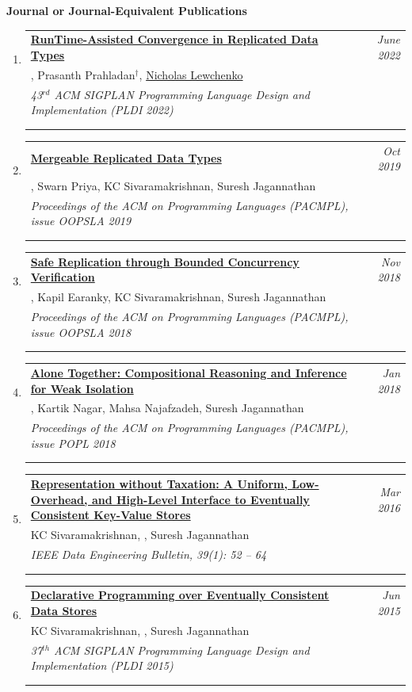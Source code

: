 \documentclass{article}
\makeatletter
\newenvironment{benumerate}[2]{
    \let\oldItem\item
    \def\item{\addtocounter{enumi}{-2}\oldItem}
    \begin{enumerate}[#2] \itemsep3pt
    \setcounter{enumi}{#1}
    \addtocounter{enumi}{1}}
  {\end{enumerate}}
\newenvironment{region}[3]{%
  {{\textbf{#1}}}
  \begin{benumerate}{#3}{\color{RoyalBlue}#2}}
  {\end{benumerate}\vspace{0.8ex}}
\newenvironment{publication}[6]
{ \item
  \begin{tabular*}{6.8in}{p{6in}@{\extracolsep{\fill}}r}
    \href{#1}{\textbf{#2}} & \textit{#3}\\ #4 &\\ \textit{#5}&\\
    \ifthenelse{\equal{#6}{}}{}{#6&\\}
  \end{tabular*}
} {}
\makeatother
\begin{document}
\begin{region} {Journal or Journal-Equivalent Publications}{{J}1}{12}
\begin{publication} {https://gowthamk.github.io/docs/pldi22.pdf}
  {RunTime-Assisted Convergence in Replicated Data Types}
  {June 2022} {\ugkaki, Prasanth Prahladan$^\dag$, \underline{Nicholas Lewchenko}}
  {43$^{rd}$ ACM SIGPLAN Programming Language Design and
  Implementation (PLDI 2022)}
  {Pages 364 - 378 (double column); Accceptance rate: 20\%}
\end{publication}


\begin{publication}{https://gowthamk.github.io/docs/mrdt.pdf}
		{Mergeable Replicated Data Types}
    {Oct 2019}{\ugkaki, Swarn Priya, KC Sivaramakrishnan, Suresh Jagannathan}
    {Proceedings of the ACM on Programming Languages (PACMPL), issue OOPSLA
    2019}
    {Article No.: 154; Pages 1 - 29; Acceptance rate: 36\%}
  \end{publication}

	\begin{publication}{https://gowthamk.github.io/docs/q9.pdf}
		{Safe Replication through Bounded Concurrency Verification}
    {Nov 2018}{\ugkaki, Kapil Earanky, KC Sivaramakrishnan, Suresh Jagannathan}
    {Proceedings of the ACM on Programming Languages (PACMPL), issue OOPSLA
    2018}
    {Article No.: 164; Pages 1 - 27; Acceptance rate: 28\%}
  \end{publication}

  \begin{publication}{https://gowthamk.github.io/docs/popl18.pdf}
    {Alone Together: Compositional Reasoning and Inference for Weak Isolation}
    {Jan 2018}
    {\ugkaki, Kartik Nagar, Mahsa Najafzadeh, Suresh Jagannathan}
    {Proceedings of the ACM on Programming Languages (PACMPL), issue POPL
    2018}
    {Article No.: 27; Pages 1 - 34; Acceptance rate: 24\%}
  \end{publication}

  \begin{publication}{https://gowthamk.github.io/docs/quelea_ieee16.pdf}
    {Representation without Taxation: A Uniform, Low-Overhead, and High-Level Interface to Eventually Consistent Key-Value Stores}
    {Mar 2016}{KC Sivaramakrishnan, \ugkaki, Suresh Jagannathan}
    {IEEE Data Engineering Bulletin, 39(1): 52 -- 64}
    {Invited article; Pages 52 - 64.}
  \end{publication}

  \begin{publication} {https://gowthamk.github.io/docs/quelea.pdf}
    {Declarative Programming over Eventually Consistent Data Stores}
    {Jun 2015} {KC Sivaramakrishnan, \ugkaki, Suresh Jagannathan}
    {37$^{th}$ ACM SIGPLAN Programming Language Design and
    Implementation (PLDI 2015)}
    {Accceptance rate: 19\%}
  \end{publication}


\end{region}
\end{document}
